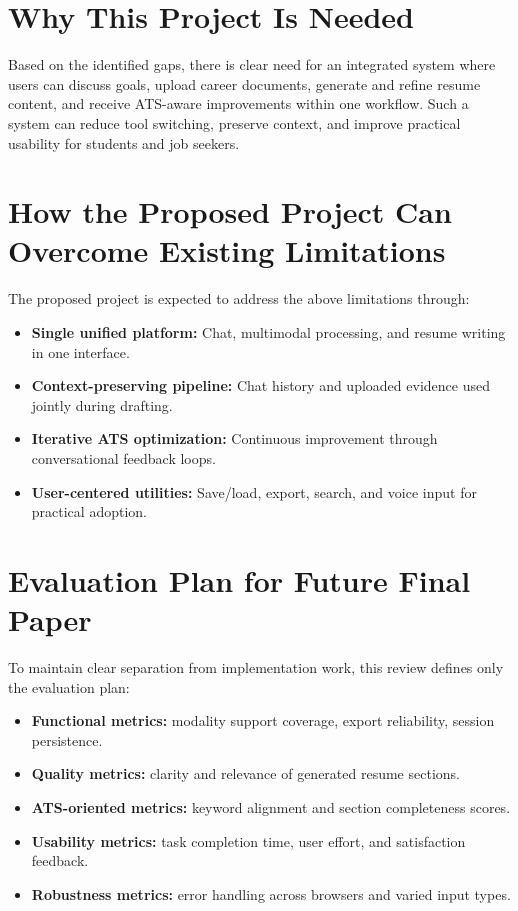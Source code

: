\documentclass[conference]{IEEEtran}
\begin{document}
\section{Why This Project Is Needed}
Based on the identified gaps, there is clear need for an integrated system where users can discuss goals, upload career documents, generate and refine resume content, and receive ATS-aware improvements within one workflow. Such a system can reduce tool switching, preserve context, and improve practical usability for students and job seekers.

\section{How the Proposed Project Can Overcome Existing Limitations}
The proposed project is expected to address the above limitations through:
\begin{itemize}
    \item \textbf{Single unified platform:} Chat, multimodal processing, and resume writing in one interface.
    \item \textbf{Context-preserving pipeline:} Chat history and uploaded evidence used jointly during drafting.
    \item \textbf{Iterative ATS optimization:} Continuous improvement through conversational feedback loops.
    \item \textbf{User-centered utilities:} Save/load, export, search, and voice input for practical adoption.
\end{itemize}

\section{Evaluation Plan for Future Final Paper}
To maintain clear separation from implementation work, this review defines only the evaluation plan:
\begin{itemize}
    \item \textbf{Functional metrics:} modality support coverage, export reliability, session persistence.
    \item \textbf{Quality metrics:} clarity and relevance of generated resume sections.
    \item \textbf{ATS-oriented metrics:} keyword alignment and section completeness scores.
    \item \textbf{Usability metrics:} task completion time, user effort, and satisfaction feedback.
    \item \textbf{Robustness metrics:} error handling across browsers and varied input types.
\end{itemize}
\end{document}
